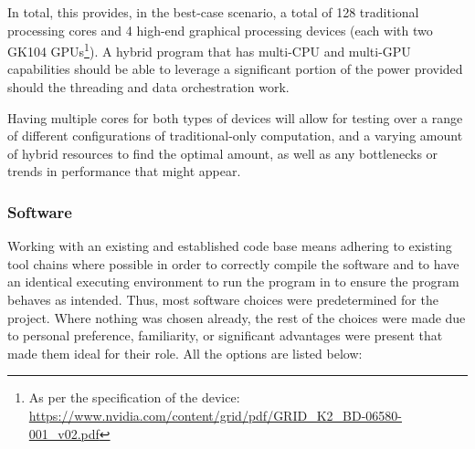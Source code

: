 \documentclass[conference]{IEEEtran}
\begin{document}
In total, this provides, in the best-case scenario, a total of 128 traditional processing cores and 4 high-end graphical processing devices (each with two GK104 GPUs\footnote{As per the specification of the device: \url{https://www.nvidia.com/content/grid/pdf/GRID_K2_BD-06580-001_v02.pdf}}). A hybrid program that has multi-CPU and multi-GPU capabilities should be able to leverage a significant portion of the power provided should the threading and data orchestration work.

Having multiple cores for both types of devices will allow for testing over a range of different configurations of traditional-only computation, and a varying amount of hybrid resources to find the optimal amount, as well as any bottlenecks or trends in performance that might appear.

\subsubsection{Software}

Working with an existing and established code base means adhering to existing tool chains where possible in order to correctly compile the software and to have an identical executing environment to run the program in to ensure the program behaves as intended. Thus, most software choices were predetermined for the project. Where nothing was chosen already, the rest of the choices were made due to personal preference, familiarity, or significant advantages were present that made them ideal for their role. All the options are listed below:
\end{document}
